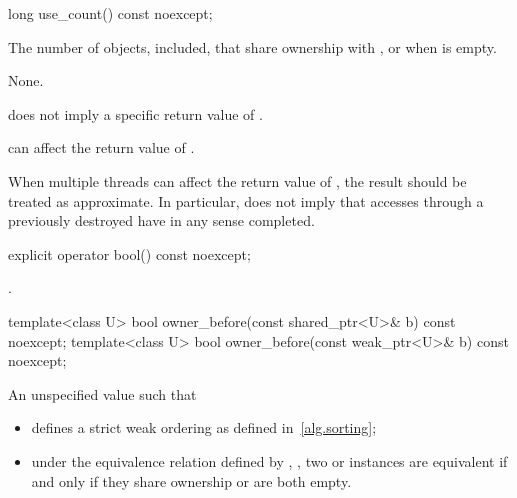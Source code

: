 %
\begin{itemdecl}
long use_count() const noexcept;
\end{itemdecl}

\begin{itemdescr}
\pnum\returns  The number of  objects,  included,
that share ownership with , or  when  is
empty.

\pnum\sync None.

\pnum \begin{note} 
does not imply a specific return value of . \end{note}

\pnum \begin{note} 
can affect the return value of . \end{note}

\pnum \begin{note} When multiple threads
can affect the return value of ,
the result should be treated as approximate.
In particular,  does not imply that accesses through
a previously destroyed  have in any sense completed. \end{note}
\end{itemdescr}

%
\begin{itemdecl}
explicit operator bool() const noexcept;
\end{itemdecl}

\begin{itemdescr}
\pnum\returns {}.
\end{itemdescr}

%
\begin{itemdecl}
template<class U> bool owner_before(const shared_ptr<U>& b) const noexcept;
template<class U> bool owner_before(const weak_ptr<U>& b) const noexcept;
\end{itemdecl}

\begin{itemdescr}
\pnum
\returns An unspecified value such that

\begin{itemize}
\item {} defines a strict weak ordering as defined in~\ref{alg.sorting};

\item under the equivalence relation defined by ,
, two  or
 instances are equivalent if and only if they share ownership or
are both empty.
\end{itemize}

\end{itemdescr}


